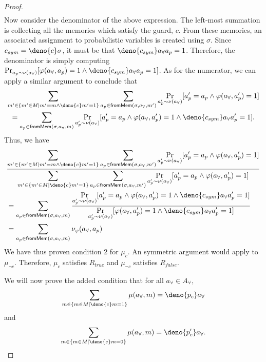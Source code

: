 \documentclass[acmsmall,review,anonymous]{acmart}\settopmatter{printfolios=true,printccs=false,printacmref=false}
\begin{document}
\begin{proof}
\begin{align*}
  \end{align*}
  Now consider the denominator of the above expression. The left-most summation is collecting all the memories which satisfy the guard, $c$. From these memories, an associated assignment to probabilistic variables is created using $\sigma$. Since $c_{sym} = \deno{c} \sigma$, it must be that $\deno{c_{sym}} a_{\forall} a_p = 1$. Therefore, the denominator is simply computing $\Pr_{a_p \sim \nu(a_{\forall})}[\varphi(a_{\forall},a_p) = 1 \wedge \deno{c_{sym}} a_{\forall} a_p = 1]$. As for the numerator, we can apply a similar argument to conclude that\begin{multline*}
    \sum_{m' \in \{m' \in \mathit{M} \mid m' = m \wedge \deno{c}m' = 1\}}\sum_{a_p \in \mathsf{fromMem}(\sigma,a_{\forall},m')} \Pr_{a_p' \sim \nu(a_{\forall})}[a_p' = a_p \wedge \varphi(a_{\forall},a_p')=1] \\= \sum_{a_p \in \mathsf{fromMem}(\sigma,a_{\forall},m)}\Pr_{a_p' \sim \nu(a_{\forall})}[a_p' = a_p \wedge \varphi(a_{\forall},a_p') = 1 \wedge \deno{c_{sym}} a_{\forall} a_p' = 1].
  \end{multline*}
  Thus, we have
  \begin{equation*}
    \begin{split}
      &\frac{\displaystyle\sum_{m' \in \{m' \in \mathit{M} \mid m' = m \wedge \deno{c}m' = 1\}}\sum_{a_p \in \mathsf{fromMem}(\sigma,a_{\forall},m')} \Pr_{a_p' \sim \nu(a_{\forall})}[a_p' = a_p \wedge \varphi(a_{\forall},a_p')=1]}{\displaystyle\sum_{m' \in \{m' \in \mathit{M} \mid \deno{c}m' = 1\}}\sum_{a_p \in \mathsf{fromMem}(\sigma,a_{\forall},m')} \Pr_{a_p' \sim \nu(a_{\forall})}[a_p' = a_p \wedge \varphi(a_{\forall},a_p')=1]}\\
      &= \sum_{a_p \in \mathsf{fromMem}(\sigma,a_{\forall},m)}\frac{\displaystyle\Pr_{a_p' \sim \nu(a_{\forall})}[a_p' = a_p \wedge \varphi(a_{\forall},a_p') = 1 \wedge \deno{c_{sym}} a_{\forall} a_p' = 1]}{\displaystyle\Pr_{a_p' \sim \nu(a_{\forall})}[\varphi(a_{\forall},a_p') = 1 \wedge \deno{c_{sym}} a_{\forall} a_p' = 1]}\\
      &= \sum_{a_p \in \mathsf{fromMem}(\sigma,a_{\forall},m)} \nu_{\varphi}(a_{\forall},a_p)
    \end{split}
  \end{equation*}
  We have thus proven condition 2 for $\mu_c$. An symmetric argument would apply to $\mu_{\neg c}$. Therefore, $\mu_c$ satisfies $R_{true}$ and $\mu_{\neg c}$ satisfies $R_{false}$.

  We will now prove the added condition that for all $a_{\forall} \in \mathit{A}_{\forall}$, 
  \[
    \sum_{m \in \{m \in \mathit{M} \mid \deno{c}m = 1\}}\mu(a_{\forall},m) = \deno{p_c} a_{\forall}
  \]
  and
  \[
    \sum_{m \in \{m \in \mathit{M} \mid \deno{c}m = 0\}}\mu(a_{\forall},m) = \deno{p_c'} a_{\forall}.
  \]


\end{proof}
\end{document}
